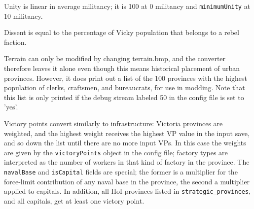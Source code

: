\documentclass[12pt,ebook,oneside]{book}
\begin{document}
Unity is linear in average militancy; it is 100 at 0 militancy and
\texttt{minimumUnity} at 10 militancy. 

Dissent is equal to the percentage of Vicky population that belongs to a
rebel faction. 

Terrain can only be modified by changing terrain.bmp, and the
converter therefore leaves it alone even though this means historical
placement of urban provinces. However, it does print out a list of the
100 provinces with the highest population of clerks, craftsmen, and
bureaucrats, for use in modding. Note that this list is only printed
if the debug stream labeled 50 in the config file is set to 'yes'. 

Victory points convert similarly to infrastructure: Victoria provinces
are weighted, and the highest weight receives the highest VP value in
the input save, and so down the list until there are no more input
VPs. In this case the weights are given by the \texttt{victoryPoints}
object in the config file; factory types are interpreted as the number
of workers in that kind of factory in the province. The
\texttt{navalBase} and \texttt{isCapital} fields are special; the
former is a multiplier for the force-limit contribution of any naval
base in the province, the second a multiplier applied to capitals. In addition,
all HoI provinces listed in \texttt{strategic\_provinces}, and all
capitals, get at least one victory point. 
\end{document}
